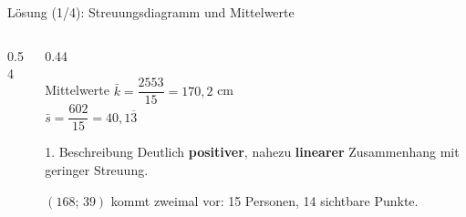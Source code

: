 \documentclass[aspectratio=169,11pt]{beamer}
\newcommand{\koerperpunkte}{\addplot[only marks, mark=*, mark size=2.2pt, color=hsbiblue]
  coordinates {(164,39) (162,38) (168,39) (198,46) (166,40) (166,39) (192,45) (160,37) (151,36) (175,42) (180,43) (160,38) (168,41) (175,40) (168,39)};}
\begin{document}
\begin{frame}{Lösung (1/4): Streuungsdiagramm und Mittelwerte}
  \begin{columns}[T]
    \begin{column}{0.54\textwidth}
    \end{column}
    \begin{column}{0.44\textwidth}
      \small
      \begin{block}{Mittelwerte}
        $\bar{k} = \dfrac{2553}{15} = 170{,}2$ cm\\[3pt]
        $\bar{s} = \dfrac{602}{15} = 40{,}1\overline{3}$
      \end{block}
      \begin{exampleblock}{1. Beschreibung}
        Deutlich \textbf{positiver}, nahezu \textbf{linearer} Zusammenhang
        mit geringer Streuung.
      \end{exampleblock}
      \footnotesize $(168;\,39)$ kommt zweimal vor: 15 Personen, 14 sichtbare Punkte.
    \end{column}
  \end{columns}
\end{frame}
\end{document}
